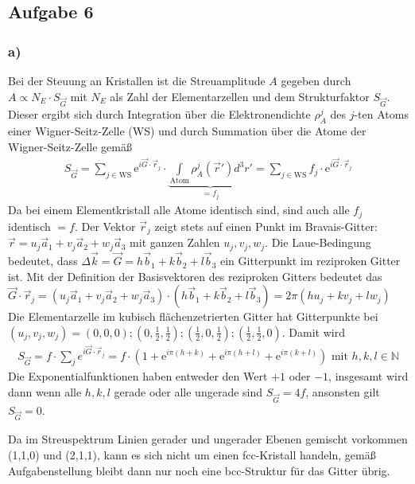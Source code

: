 \documentclass[11pt]{article}
\newcommand*{\NN}{\mathbb N}
\begin{document}
\subsection*{Aufgabe 6}
\subsubsection*{a)}
Bei der Steuung an Kristallen ist die Streuamplitude $A$ gegeben durch
$A \propto N_E \cdot S_{\vec G}$ mit $N_E$ als Zahl der Elementarzellen und
dem Strukturfaktor $S_{\vec G}$. Dieser ergibt sich durch Integration über die
Elektronendichte $\rho_A^j$ des $j$-ten Atoms einer Wigner-Seitz-Zelle (WS)
und durch Summation über die Atome der Wigner-Seitz-Zelle gemäß
\begin{align*}
  S_{\vec G} = \sum_{j \in \text{WS}} \mathrm e^{i \vec G \cdot \vec r_j} \cdot \underbrace{
   \int \limits_{\text{Atom}}\rho_A^j (\vec r') d^3 r'}_{= f_j} =
   \sum_{j \in \text{WS}} f_j \cdot \mathrm e^{i \vec G \cdot \vec r_j}
\end{align*}
Da bei einem Elementkristall alle Atome identisch sind, sind auch alle $f_j$
identisch $= f$. Der Vektor $\vec r_j$ zeigt stets auf einen Punkt
im Bravais-Gitter: $\vec r = u_j \vec a_1 + v_j \vec a_2 + w_j \vec a_3$ mit
ganzen Zahlen $u_j, v_j, w_j$. Die Laue-Bedingung bedeutet, dass
$\Delta \vec k = \vec G = h \vec b_1 + k \vec b_2 + l \vec b_3$ ein Gitterpunkt
im reziproken Gitter ist. Mit der Definition der Basisvektoren des reziproken
Gitters bedeutet das $\vec G \cdot \vec r_j =  (u_j \vec a_1 + v_j \vec a_2 + w_j \vec a_3)
\cdot (h \vec b_1 + k \vec b_2 + l \vec b_3) = 2 \pi (h u_j + k v_j + l w_j)$
Die Elementarzelle im kubisch flächenzetrierten Gitter hat Gitterpunkte bei
$(u_j,v_j,w_j) = (0,0,0); (0,\frac{1}{2},\frac{1}{2}); (\frac{1}{2}, 0, \frac{1}{2});
(\frac{1}{2},\frac{1}{2}, 0)$. Damit wird
\begin{align*}
  S_{\vec G} = f \cdot \sum_{j}  e^{i \vec G \cdot \vec r_j} =
  f \cdot \left(1 + \mathrm e^{i \pi (h + k)} + \mathrm e^{i \pi (h + l)} + \mathrm e^{i \pi (k + l)} \right)
  \text{ mit } h, k, l \in \NN
\end{align*}
Die Exponentialfunktionen haben entweder den Wert $+1$ oder $-1$, insgesamt wird dann
wenn alle $h, k, l$ gerade oder alle ungerade sind $S_{\vec G} = 4 f$, ansonsten gilt
$S_{\vec G} = 0$.

Da im Streuspektrum Linien gerader und ungerader Ebenen gemischt vorkommen
(1,1,0) und (2,1,1), kann es sich nicht um einen fcc-Kristall handeln,
gemäß Aufgabenstellung bleibt dann nur noch eine bcc-Struktur für das Gitter übrig.
\end{document}
